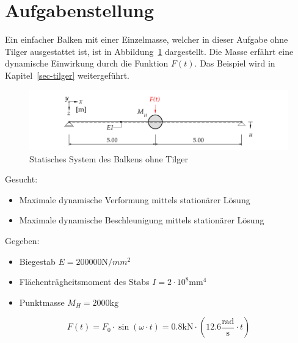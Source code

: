 \documentclass[
  letterpaper,
  DIV=11]{scrreprt}
\providecommand{\tightlist}{%
  \setlength{\itemsep}{0pt}\setlength{\parskip}{0pt}}\usepackage{longtable,booktabs,array}
\begin{document}
\hypertarget{aufgabenstellung-9}{%
\section{Aufgabenstellung}\label{aufgabenstellung-9}}

Ein einfacher Balken mit einer Einzelmasse, welcher in dieser Aufgabe
ohne Tilger ausgestattet ist, ist in
Abbildung~\ref{fig-ems_untilg_system_ohne_tilger} dargestellt. Die Masse
erfährt eine dynamische Einwirkung durch die Funktion \(F(t)\). Das
Beispiel wird in Kapitel~\ref{sec-tilger} weitergeführt.

\begin{figure}[H]

{\centering \includegraphics{index_files/mediabag/bilder/aufgabe_ems_untilg_system.pdf}

}

\caption{\label{fig-ems_untilg_system_ohne_tilger}Statisches System des
Balkens ohne Tilger}

\end{figure}

Gesucht:

\begin{itemize}
\tightlist
\item
  Maximale dynamische Verformung mittels stationärer Lösung
\item
  Maximale dynamische Beschleunigung mittels stationärer Lösung
\end{itemize}

Gegeben:

\begin{itemize}
\tightlist
\item
  Biegestab \(E = 200000 \text{N}/{mm}^2\)
\item
  Flächenträgheitsmoment des Stabs \(I = 2 \cdot 10^8 \text{mm}^4\)
\item
  Punktmasse \(M_H = 2000 \text{kg}\)
\end{itemize}

\[
F(t) = F_0 \cdot \sin(\omega\cdot t) = 0.8 \text{kN} \cdot (12.6 \frac{\text{rad}}{\text{s}}\cdot t)
\]

\newpage{}
\end{document}
